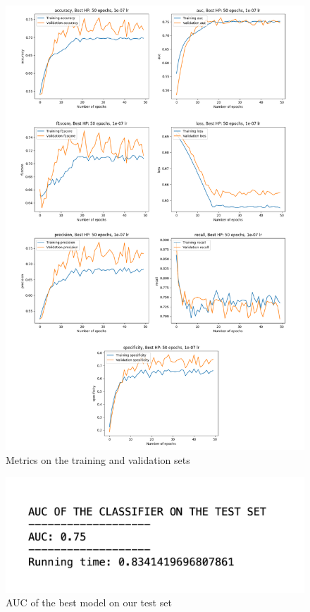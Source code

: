 \begin{figure}[!h]
\centering
\includegraphics[width=1.1\textwidth, keepaspectratio=true]{./figures/paper_reproduction_results.png}
\caption{Metrics on the training and validation sets}
\label{fig:paper_reprodution_results}
\end{figure}


\begin{figure}[!h]
\centering
\includegraphics[width=1\textwidth, keepaspectratio=true]{./figures/auc_our_test_set.png}
\caption{AUC of the best model on our test set}
\label{fig:paper_reprodution_auc_on_our_test_set}
\end{figure}

